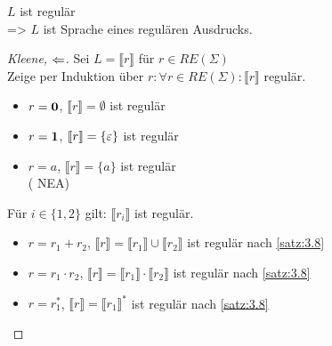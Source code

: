\begin{Satz}[Kleene]
$L$ ist regulär\\
\<=> $L$ ist Sprache eines regulären Ausdrucks.
\end{Satz}

\begin{proof}[Kleene, $\<=$]
  Sei $L=\llbracket r \rrbracket$ für $r\in RE(\Sigma)$\\
		Zeige per Induktion über $r: \forall r\in RE(\Sigma) : \llbracket r \rrbracket$ regulär.
    	\begin{description}[font=\normalfont]
      \item[I.A.:] \hfill
        \vspace{-\baselineskip}
        \begin{itemize}
        \item $r = \mathbf{0}$, $\llbracket r \rrbracket = \emptyset$ ist regulär
        \item $r = \mathbf{1}$, $\llbracket r \rrbracket = \{ \varepsilon \}$ ist regulär
        \item $r = a$, $\llbracket r \rrbracket = \{ a \}$ ist regulär \\
          (
    			 \quad\acs{NEA}) 
        \end{itemize}
        \item[I.V.:] Für $i \in \{1, 2\}$ gilt: $\llbracket r_i \rrbracket$ ist regulär.
    		\item[I.S.:] \hfill
          \vspace{-\baselineskip}
          \begin{itemize}
          \item $r = r_1 + r_2$, $\llbracket r \rrbracket = \llbracket r_1 \rrbracket \cup \llbracket r_2 \rrbracket$ ist regulär nach \autoref{satz:3.8}
          \item $r = r_1 \cdot r_2$, $\llbracket r \rrbracket = \llbracket r_1 \rrbracket \cdot \llbracket r_2 \rrbracket$ ist regulär nach \autoref{satz:3.8}
          \item $r = r_1^*$, $\llbracket r \rrbracket = \llbracket r_1 \rrbracket^*$ ist regulär nach \autoref{satz:3.8}
          \end{itemize}
		\end{description}
\end{proof}

